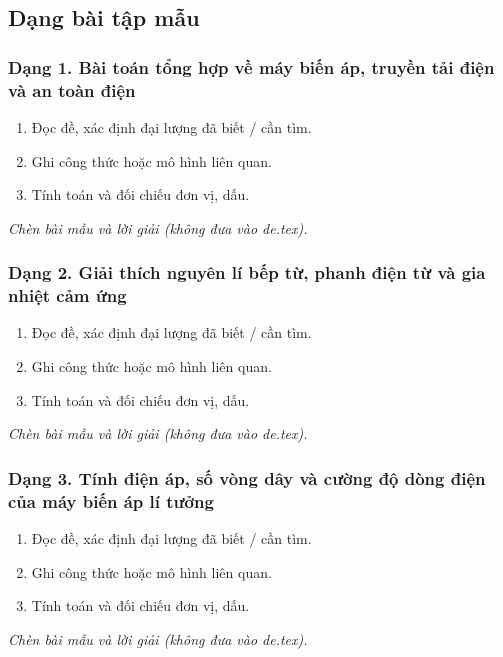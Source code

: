 

\subsection{Dạng bài tập mẫu}
\subsubsection{Dạng 1. Bài toán tổng hợp về máy biến áp, truyền tải điện và an toàn điện}
\begin{phuongphap}
\begin{enumerate}
\item Đọc đề, xác định đại lượng đã biết / cần tìm.
\item Ghi công thức hoặc mô hình liên quan.
\item Tính toán và đối chiếu đơn vị, dấu.
\end{enumerate}
\end{phuongphap}
\begin{vidumau}
\textit{Chèn bài mẫu và lời giải (không đưa vào de.tex).}
\end{vidumau}

\subsubsection{Dạng 2. Giải thích nguyên lí bếp từ, phanh điện từ và gia nhiệt cảm ứng}
\begin{phuongphap}
\begin{enumerate}
\item Đọc đề, xác định đại lượng đã biết / cần tìm.
\item Ghi công thức hoặc mô hình liên quan.
\item Tính toán và đối chiếu đơn vị, dấu.
\end{enumerate}
\end{phuongphap}
\begin{vidumau}
\textit{Chèn bài mẫu và lời giải (không đưa vào de.tex).}
\end{vidumau}

\subsubsection{Dạng 3. Tính điện áp, số vòng dây và cường độ dòng điện của máy biến áp lí tưởng}
\begin{phuongphap}
\begin{enumerate}
\item Đọc đề, xác định đại lượng đã biết / cần tìm.
\item Ghi công thức hoặc mô hình liên quan.
\item Tính toán và đối chiếu đơn vị, dấu.
\end{enumerate}
\end{phuongphap}
\begin{vidumau}
\textit{Chèn bài mẫu và lời giải (không đưa vào de.tex).}
\end{vidumau}

